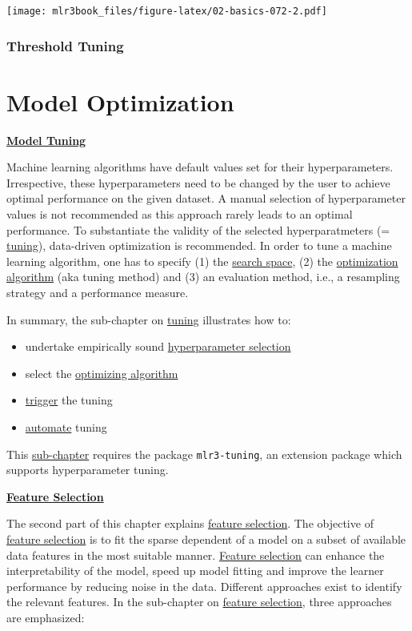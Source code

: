 \documentclass[12pt,]{scrbook}
\providecommand{\tightlist}{%
  \setlength{\itemsep}{0pt}\setlength{\parskip}{0pt}}
\begin{document}
\texttt{[image: mlr3book\_files/figure-latex/02-basics-072-2.pdf]}

\hypertarget{threshold-tuning}{%
\subsection{Threshold Tuning}\label{threshold-tuning}}

\hypertarget{model-optim}{%
\chapter{Model Optimization}\label{model-optim}}

\protect\hyperlink{tuning}{\textbf{Model Tuning}}

Machine learning algorithms have default values set for their hyperparameters.
Irrespective, these hyperparameters need to be changed by the user to achieve optimal performance on the given dataset.
A manual selection of hyperparameter values is not recommended as this approach rarely leads to an optimal performance.
To substantiate the validity of the selected hyperparatmeters (= \protect\hyperlink{tuning}{tuning}), data-driven optimization is recommended.
In order to tune a machine learning algorithm, one has to specify (1) the \protect\hyperlink{tuning-optimization}{search space}, (2) the \protect\hyperlink{tuning-optimization}{optimization algorithm} (aka tuning method) and (3) an evaluation method, i.e., a resampling strategy and a performance measure.

In summary, the sub-chapter on \protect\hyperlink{tuning}{tuning} illustrates how to:

\begin{itemize}
\tightlist
\item
  undertake empirically sound \protect\hyperlink{tuning}{hyperparameter selection}
\item
  select the \protect\hyperlink{tuning-optimization}{optimizing algorithm}
\item
  \protect\hyperlink{tuning-triggering}{trigger} the tuning
\item
  \protect\hyperlink{autotuner}{automate} tuning
\end{itemize}

This \protect\hyperlink{tuning}{sub-chapter} requires the package \texttt{mlr3-tuning}, an extension package which supports hyperparameter tuning.

\protect\hyperlink{fs}{\textbf{Feature Selection}}

The second part of this chapter explains \protect\hyperlink{fs}{feature selection}.
The objective of \protect\hyperlink{fs}{feature selection} is to fit the sparse dependent of a model on a subset of available data features in the most suitable manner.
\protect\hyperlink{fs}{Feature selection} can enhance the interpretability of the model, speed up model fitting and improve the learner performance by reducing noise in the data.
Different approaches exist to identify the relevant features.
In the sub-chapter on \protect\hyperlink{fs}{feature selection}, three approaches are emphasized:
\end{document}
